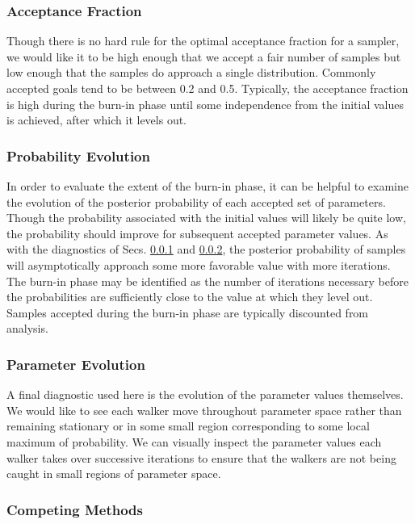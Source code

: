 \documentclass[preprint]{aastex}
\begin{document}
\subsubsection{Acceptance Fraction}
\label{sec:afrac}

Though there is no hard rule for the optimal acceptance fraction for a sampler, we would like it to be high enough that we accept a fair number of samples but low enough that the samples do approach a single distribution.  Commonly accepted goals tend to be between 0.2 and 0.5.  Typically, the acceptance fraction is high during the burn-in phase until some independence from the initial values is achieved, after which it levels out.

\subsubsection{Probability Evolution}
\label{sec:probs}

In order to evaluate the extent of the burn-in phase, it can be helpful to examine the evolution of the posterior probability of each accepted set of parameters.  Though the probability associated with the initial values will likely be quite low, the probability should improve for subsequent accepted parameter values.  As with the diagnostics of Secs. \ref{sec:afrac} and \ref{sec:probs}, the posterior probability of samples will asymptotically approach some more favorable value with more iterations.  The burn-in phase may be identified as the number of iterations necessary before the probabilities are sufficiently close to the value at which they level out.  Samples accepted during the burn-in phase are typically discounted from analysis.

\subsubsection{Parameter Evolution}
\label{sec:params}

A final diagnostic used here is the evolution of the parameter values themselves.  We would like to see each walker move throughout parameter space rather than remaining stationary or in some small region corresponding to some local maximum of probability.  We can visually inspect the parameter values each walker takes over successive iterations to ensure that the walkers are not being caught in small regions of parameter space.

\subsubsection{Competing Methods}
\label{sec:sheldon}
\end{document}
